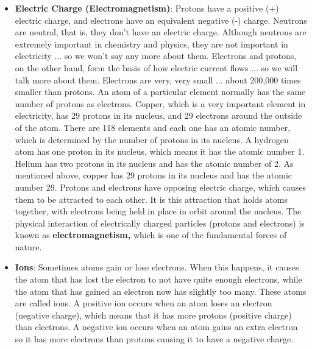 \documentclass{report}
\begin{document}
\begin{itemize}
            \bigbreak \noindent 
            Elements can exist as collections of billions of individual atoms (like solid copper or gold), or they can bond together into small groups called molecules. 
            \bigbreak \noindent 
            A \textbf{molecule} is a group of two or more atoms held together by chemical bonds
        \item \textbf{Electric Charge (Electromagnetism)}: Protons have a positive (+) electric charge, and electrons have an equivalent negative (-) charge.
            \bigbreak \noindent 
            Neutrons are neutral, that is, they don't have an electric charge. Although neutrons are extremely important in chemistry and physics, they are not important in electricity ... so we won't say any more about them. Electrons and protons, on the other hand, form the basis of how electric current flows ... so we will talk more about them.
            \bigbreak \noindent 
            Electrons are very, very small ... about 200,000 times smaller than protons. An atom of a particular element normally has the same number of protons as electrons. Copper, which is a very important element in electricity, has 29 protons in its nucleus, and 29 electrons around the outside of the atom.
            \bigbreak \noindent 
            There are 118 elements and each one has an atomic number, which is determined by the number of protons in its nucleus. A hydrogen atom has one proton in its nucleus, which means it has the atomic number 1. Helium has two protons in its nucleus and has the atomic number of 2. As mentioned above, copper has 29 protons in its nucleus and has the atomic number 29.
            \bigbreak \noindent 
            Protons and electrons have opposing electric charge, which causes them to be attracted to each other. It is this attraction that holds atoms together, with electrons being held in place in orbit around the nucleus.
            \bigbreak \noindent 
            The physical interaction of electrically charged particles (protons and electrons) is known as \textbf{electromagnetism,} which is one of the fundamental forces of nature.
        \item \textbf{Ions}: Sometimes atoms gain or lose electrons. When this happens, it causes the atom that has lost the electron to not have quite enough electrons, while the atom that has gained an electron now has slightly too many. These atoms are called ions. A positive ion occurs when an atom loses an electron (negative charge), which means that it has more protons (positive charge) than electrons. A negative ion occurs when an atom gains an extra electron so it has more electrons than protons causing it to have a negative charge.

\end{itemize}
\end{document}
